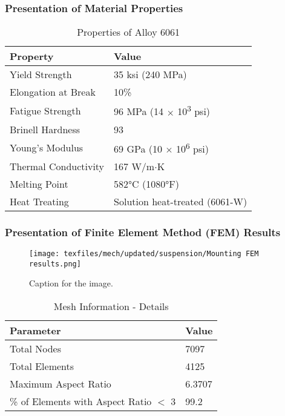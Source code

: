 \subsubsection{Presentation of Material Properties}
\begin{table}[H]
\centering
\caption{Properties of Alloy 6061}
\begin{tabular}{@{}ll@{}}
\toprule
\textbf{Property} & \textbf{Value} \\
\midrule
Yield Strength & 35 ksi (240 MPa) \\
Elongation at Break & 10\% \\
Fatigue Strength & 96 MPa (14 $\times$ 10\textsuperscript{3} psi) \\
Brinell Hardness & 93 \\
Young’s Modulus & 69 GPa (10 $\times$ 10\textsuperscript{6} psi) \\
Thermal Conductivity & 167 W/m$\cdot$K \\
Melting Point & 582°C (1080°F) \\
Heat Treating & Solution heat-treated (6061-W) \\
\bottomrule
\end{tabular}
\end{table}

\subsubsection{Presentation of Finite Element Method (FEM) Results}
\begin{figure}[H]
  \centering
  \texttt{[image: texfiles/mech/updated/suspension/Mounting FEM results.png]}
  \caption{Caption for the image.}
  \label{fig:image1}
\end{figure}


\begin{table}[H] %
\centering
\caption{Mesh Information - Details}
\begin{tabular}{@{}ll@{}}
\toprule
\textbf{Parameter} & \textbf{Value} \\
\midrule
Total Nodes & 7097 \\
Total Elements & 4125 \\
Maximum Aspect Ratio & 6.3707 \\
\% of Elements with Aspect Ratio $<$ 3 & 99.2 \\
\bottomrule
\end{tabular}
\end{table}


